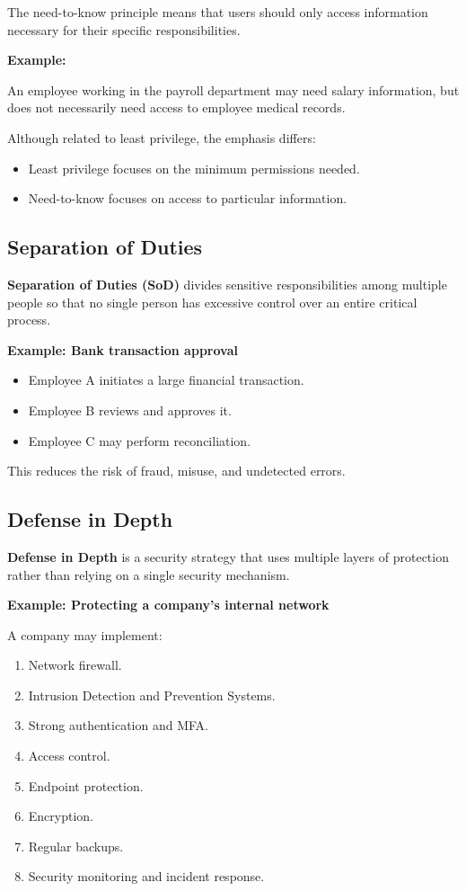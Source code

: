 The need-to-know principle means that users should only access information necessary for their specific responsibilities.

\textbf{Example:}

An employee working in the payroll department may need salary information, but does not necessarily need access to employee medical records.

Although related to least privilege, the emphasis differs:

\begin{itemize}
\item Least privilege focuses on the minimum permissions needed.
\item Need-to-know focuses on access to particular information.
\end{itemize}

\subsection{Separation of Duties}

\textbf{Separation of Duties (SoD)} divides sensitive responsibilities among multiple people so that no single person has excessive control over an entire critical process.

\textbf{Example: Bank transaction approval}

\begin{itemize}
\item Employee A initiates a large financial transaction.
\item Employee B reviews and approves it.
\item Employee C may perform reconciliation.
\end{itemize}

This reduces the risk of fraud, misuse, and undetected errors.

\subsection{Defense in Depth}

\textbf{Defense in Depth} is a security strategy that uses multiple layers of protection rather than relying on a single security mechanism.

\textbf{Example: Protecting a company's internal network}

A company may implement:

\begin{enumerate}
\item Network firewall.
\item Intrusion Detection and Prevention Systems.
\item Strong authentication and MFA.
\item Access control.
\item Endpoint protection.
\item Encryption.
\item Regular backups.
\item Security monitoring and incident response.
\end{enumerate}

